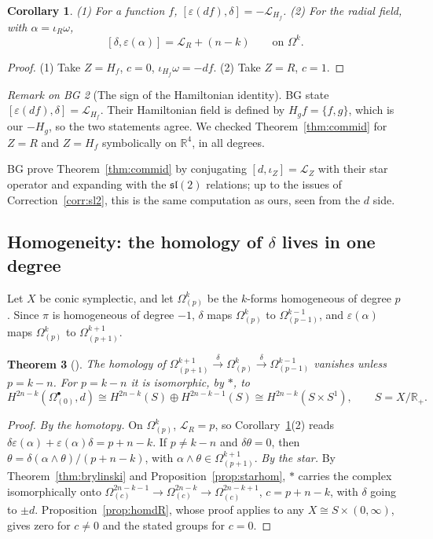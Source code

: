 \documentclass[11pt,oneside,reqno]{article}
\newcommand{\R}{\mathbb R}
\newcommand{\Om}{\Omega}
\newcommand{\eps}{\varepsilon}
\newcommand{\Lie}{\mathcal L}
\theoremstyle{plain}
\newtheorem{theorem}{Theorem}[section]
\newtheorem{corollary}[theorem]{Corollary}
\theoremstyle{definition}
\theoremstyle{remark}
\newtheorem{bgremark}[theorem]{Remark on BG}
\begin{document}
\begin{corollary}\label{cor:commid}
\textup{(1)} For a function \(f\), \([\eps(df),\delta]=-\Lie_{H_f}\).
\textup{(2)} For the radial field, with \(\alpha=\iota_R\omega\),
\[
 [\delta,\eps(\alpha)]=\Lie_R+(n-k)\qquad\text{on }\Om^k .
\]
\end{corollary}

\begin{proof}
(1) Take \(Z=H_f\), \(c=0\), \(\iota_{H_f}\omega=-df\). (2) Take \(Z=R\), \(c=1\).
\end{proof}

\begin{bgremark}[The sign of the Hamiltonian identity]\label{rem:hamsign}
BG state \([\eps(df),\delta]=\Lie_{H_f}\). Their Hamiltonian field is defined by
\(H_gf=\{f,g\}\), which is our \(-H_g\), so the two statements agree. We checked
Theorem~\ref{thm:commid} for \(Z=R\) and \(Z=H_f\) symbolically on \(\R^4\), in all
degrees.
\end{bgremark}

BG prove Theorem~\ref{thm:commid} by conjugating \([d,\iota_Z]=\Lie_Z\) with their
star operator and expanding with the \(\mathfrak{sl}(2)\) relations; up to the
issues of Correction~\ref{corr:sl2}, this is the same computation as ours,
seen from the \(d\) side.

\subsection{Homogeneity: the homology of \texorpdfstring{\(\delta\)}{delta} lives in one degree}
\label{subsec:homog}
Let \(X\) be conic symplectic, and let \(\Om^k_{(p)}\) be the \(k\)-forms homogeneous of
degree \(p\). Since \(\pi\) is homogeneous of degree \(-1\), \(\delta\) maps
\(\Om^k_{(p)}\) to \(\Om^{k-1}_{(p-1)}\), and \(\eps(\alpha)\) maps \(\Om^k_{(p)}\) to
\(\Om^{k+1}_{(p+1)}\).

\begin{theorem}[{\cite[\S2]{BG}}]\label{thm:homog}
The homology of \(\Om^{k+1}_{(p+1)}\xrightarrow{\delta}\Om^k_{(p)}\xrightarrow{\delta}\Om^{k-1}_{(p-1)}\)
vanishes unless \(p=k-n\). For \(p=k-n\) it is isomorphic, by \(*\), to
\[
 H^{2n-k}(\Om^\bullet_{(0)},d)\cong H^{2n-k}(S)\oplus H^{2n-k-1}(S)\cong H^{2n-k}(S\times S^1),
 \qquad S=X/\R_+ .
\]
\end{theorem}

\begin{proof}
\emph{By the homotopy.} On \(\Om^k_{(p)}\), \(\Lie_R=p\), so Corollary~\ref{cor:commid}(2)
reads \(\delta\eps(\alpha)+\eps(\alpha)\delta=p+n-k\). If \(p\ne k-n\) and \(\delta\theta=0\), then
\(\theta=\delta(\alpha\wedge\theta)/(p+n-k)\), with \(\alpha\wedge\theta\in\Om^{k+1}_{(p+1)}\).
\emph{By the star.} By Theorem~\ref{thm:brylinski} and
Proposition~\ref{prop:starhom}, \(*\) carries the complex isomorphically onto
\(\Om^{2n-k-1}_{(c)}\to\Om^{2n-k}_{(c)}\to\Om^{2n-k+1}_{(c)}\), \(c=p+n-k\), with \(\delta\)
going to \(\pm d\). Proposition~\ref{prop:homdR}, whose proof applies to any
\(X\cong S\times(0,\infty)\), gives zero for \(c\ne0\) and the stated groups for \(c=0\).
\end{proof}
\end{document}
